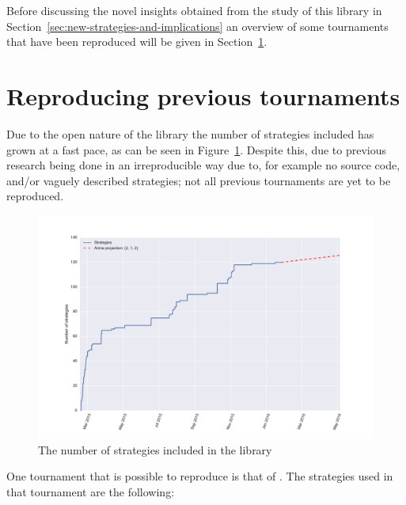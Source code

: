 \documentclass{article}
\begin{document}
Before discussing the novel insights obtained from the study of this library in
Section~\ref{sec:new-strategies-and-implications} an overview of some
tournaments that have been reproduced will be given in
Section~\ref{sec:reproducing-previous-tournaments}.

\section{Reproducing previous tournaments}\label{sec:reproducing-previous-tournaments}

Due to the open nature of the library the number of strategies included has
grown at a fast pace, as can be seen in
Figure~\ref{fig:number_of_strategies_against_date}. Despite this, due to
previous research being done in an irreproducible way due to, for example no
source code, and/or vaguely described strategies; not all previous tournaments
are yet to be reproduced.

\begin{figure}[!hbtp] \centering
    \includegraphics[width=.8\textwidth]{../img/number_of_strategies_with_arima_projection.pdf}
    \caption{The number of strategies included in the library}
    \label{fig:number_of_strategies_against_date}
\end{figure}

One tournament that is possible to reproduce is that of
\cite{Stewart2012}. The strategies used in that tournament are the following:
\end{document}

